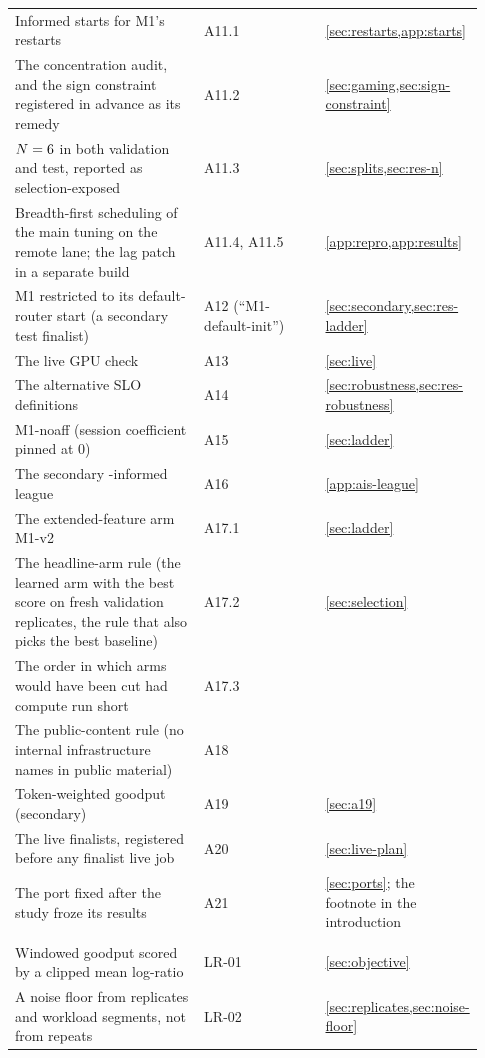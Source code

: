 {\begin{longtable}{@{}P{0.42\linewidth}P{0.27\linewidth}P{0.24\linewidth}@{}}
Informed starts for M1's restarts & A11.1 & \cref{sec:restarts,app:starts} \\
The concentration audit, and the sign constraint registered in advance as its remedy & A11.2 &
  \cref{sec:gaming,sec:sign-constraint} \\
$N = 6$ in both validation and test, reported as selection-exposed & A11.3 &
  \cref{sec:splits,sec:res-n} \\
Breadth-first scheduling of the main tuning on the remote lane; the lag patch in a separate build
  & A11.4, A11.5 & \cref{app:repro,app:results} \\
M1 restricted to its default-router start (a secondary test finalist) & A12 (``M1-default-init'')
  & \cref{sec:secondary,sec:res-ladder} \\
The live GPU check & A13 & \cref{sec:live} \\
The alternative SLO definitions & A14 & \cref{sec:robustness,sec:res-robustness} \\
M1-noaff (session coefficient pinned at 0) & A15 & \cref{sec:ladder} \\
The secondary \ais{}-informed league & A16 & \cref{app:ais-league} \\
The extended-feature arm M1-v2 & A17.1 & \cref{sec:ladder} \\
The headline-arm rule (the learned arm with the best score on fresh validation replicates, the rule
  that also picks the best baseline) & A17.2 & \cref{sec:selection} \\
The order in which arms would have been cut had compute run short & A17.3 & \\
The public-content rule (no internal infrastructure names in public material) & A18 & \\
Token-weighted goodput (secondary) & A19 & \cref{sec:a19} \\
The live finalists, registered before any finalist live job & A20 & \cref{sec:live-plan} \\
The  port fixed after the study froze its results & A21 & \cref{sec:ports}; the
  footnote in the introduction \\
\LTgrouprule
{} \\*
Windowed goodput scored by a clipped mean log-ratio & LR-01 & \cref{sec:objective} \\
A noise floor from replicates and workload segments, not from repeats & LR-02 &
  \cref{sec:replicates,sec:noise-floor} \\

\end{longtable}}
